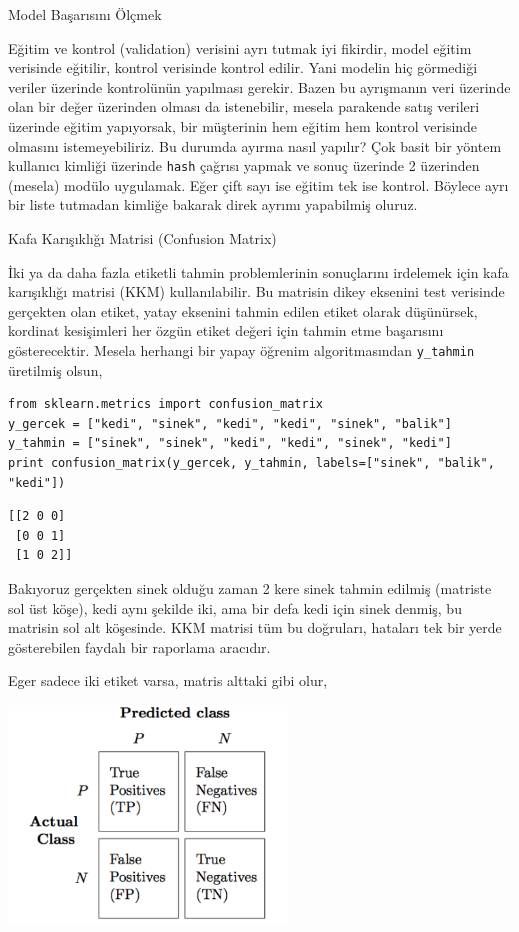 \documentclass[12pt,fleqn]{article}\usepackage{../../common}
\begin{document}
Model Başarısını Ölçmek

Eğitim ve kontrol (validation) verisini ayrı tutmak iyi fikirdir, model
eğitim verisinde eğitilir, kontrol verisinde kontrol edilir. Yani modelin
hiç görmediği veriler üzerinde kontrolünün yapılması gerekir. Bazen bu
ayrışmanın veri üzerinde olan bir değer üzerinden olması da istenebilir,
mesela parakende satış verileri üzerinde eğitim yapıyorsak, bir müşterinin
hem eğitim hem kontrol verisinde olmasını istemeyebiliriz. Bu durumda
ayırma nasıl yapılır? Çok basit bir yöntem kullanıcı kimliği üzerinde
\verb!hash! çağrısı yapmak ve sonuç üzerinde 2 üzerinden (mesela) modülo
uygulamak. Eğer çift sayı ise eğitim tek ise kontrol. Böylece ayrı bir
liste tutmadan kimliğe bakarak direk ayrımı yapabilmiş oluruz.  

Kafa Karışıklığı Matrisi (Confusion Matrix) 

İki ya da daha fazla etiketli tahmin problemlerinin sonuçlarını irdelemek
için kafa karışıklığı matrisi (KKM) kullanılabilir. Bu matrisin dikey
eksenini test verisinde gerçekten olan etiket, yatay eksenini tahmin edilen
etiket olarak düşünürsek, kordinat kesişimleri her özgün etiket değeri
için tahmin etme başarısını gösterecektir. Mesela herhangi bir yapay
öğrenim algoritmasından \verb!y_tahmin! üretilmiş olsun,

\begin{verbatim}
from sklearn.metrics import confusion_matrix
y_gercek = ["kedi", "sinek", "kedi", "kedi", "sinek", "balik"]
y_tahmin = ["sinek", "sinek", "kedi", "kedi", "sinek", "kedi"]
print confusion_matrix(y_gercek, y_tahmin, labels=["sinek", "balik", "kedi"])
\end{verbatim}

\begin{verbatim}
[[2 0 0]
 [0 0 1]
 [1 0 2]]
\end{verbatim}

Bakıyoruz gerçekten sinek olduğu zaman 2 kere sinek tahmin edilmiş
(matriste sol üst köşe), kedi aynı şekilde iki, ama bir defa kedi için
sinek denmiş, bu matrisin sol alt köşesinde. KKM matrisi tüm bu doğruları,
hataları tek bir yerde gösterebilen faydalı bir raporlama aracıdır. 

Eger sadece iki etiket varsa, matris alttaki gibi olur,

\includegraphics[width=20em]{modeval_06.png}
\end{document}
